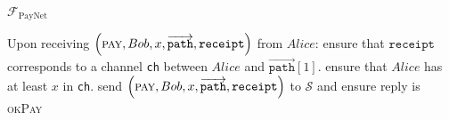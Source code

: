 \begin{functionality}{$\mathcal{F}_{\mathrm{PayNet}}$}
\begin{algorithmic}[1]
    \State Upon receiving $\left(\textsc{pay}, Bob, x,
    \overrightarrow{\mathtt{path}}, \mathtt{receipt}\right)$ from $Alice$:
    \Indent
      \State ensure that $\mathtt{receipt}$ corresponds to a channel \texttt{ch}
      between $Alice$ and $\overrightarrow{\mathtt{path}}\left[1\right]$.
      \State ensure that $Alice$ has at least $x$ in \texttt{ch}.
      \State send $\left(\textsc{pay}, Bob, x, \overrightarrow{\mathtt{path}},
      \mathtt{receipt}\right)$ to $\mathcal{S}$ and ensure reply is
      \textsc{okPay}
      \EndFor

\end{algorithmic}
\end{functionality}

